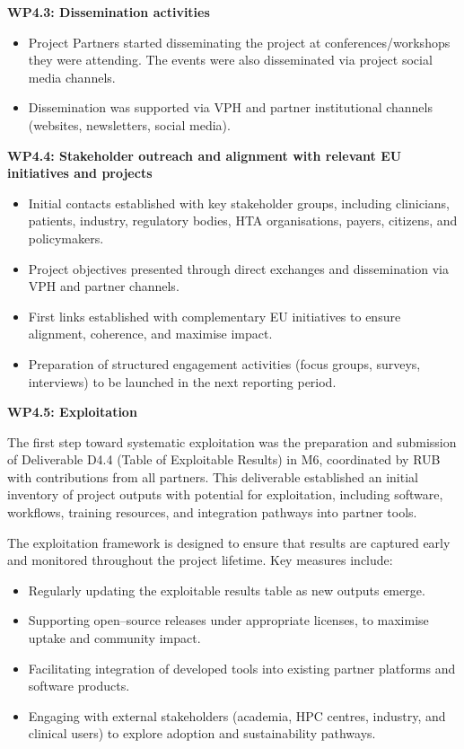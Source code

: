 \documentclass[a4paper,12pt, numbers]{article}
\begin{document}
\noindent\textbf{WP4.3: Dissemination activities}

\begin{itemize}[left=1em, itemsep=0pt, topsep=0pt]
\item Project Partners started disseminating the project at conferences/workshops they were attending. The events were also disseminated via project social media channels. 
\item Dissemination was supported via VPH and partner institutional channels (websites, newsletters, social media).
\end{itemize}

\noindent\textbf{WP4.4: Stakeholder outreach and alignment with relevant EU initiatives and projects} %


\begin{itemize}[left=1em, itemsep=0pt, topsep=0pt]
\item Initial contacts established with key stakeholder groups, including clinicians, patients, industry, regulatory bodies, HTA organisations, payers, citizens, and policymakers.
\item Project objectives presented through direct exchanges and dissemination via VPH and partner channels.
\item First links established with complementary EU initiatives to ensure alignment, coherence, and maximise impact.
\item Preparation of structured engagement activities (focus groups, surveys, interviews) to be launched in the next reporting period.
\end{itemize}



\noindent\textbf{WP4.5: Exploitation}

The first step toward systematic exploitation was the preparation and submission of Deliverable D4.4 (Table of Exploitable Results) in M6, coordinated by RUB with contributions from all partners. This deliverable established an initial inventory of project outputs with potential for exploitation, including software, workflows, training resources, and integration pathways into partner tools.  

The exploitation framework is designed to ensure that results are captured early and monitored throughout the project lifetime. Key measures include:  
\begin{itemize}[left=1em, itemsep=0pt, topsep=0pt]
\item Regularly updating the exploitable results table as new outputs emerge.  
\item Supporting open--source releases under appropriate licenses, to maximise uptake and community impact.  
\item Facilitating integration of developed tools into existing partner platforms and software products.  
\item Engaging with external stakeholders (academia, HPC centres, industry, and clinical users) to explore adoption and sustainability pathways.  
\end{itemize}
\end{document}

